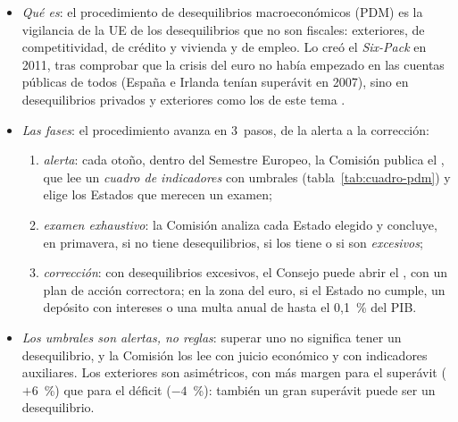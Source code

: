 \documentclass[11pt]{article}
\begin{document}
\begin{itemize}
\item \emph{Qué es}: el procedimiento de desequilibrios macroeconómicos (PDM) es la vigilancia de la UE de los desequilibrios que no son fiscales: exteriores, de competitividad, de crédito y vivienda y de empleo. Lo creó el \emph{Six-Pack} en 2011, tras comprobar que la crisis del euro no había empezado en las cuentas públicas de todos (España e Irlanda tenían superávit en 2007), sino en desequilibrios privados y exteriores como los de este tema\nocite{UE2011Reglamento1176,UE2011Reglamento1174} .
\item \emph{Las fases}: el procedimiento avanza en 3~pasos, de la alerta a la corrección:
  \begin{enumerate}
  \item \emph{alerta}: cada otoño, dentro del Semestre Europeo, la Comisión publica el , que lee un \emph{cuadro de indicadores} con umbrales (tabla~\ref{tab:cuadro-pdm}) y elige los Estados que merecen un examen;
  \item \emph{examen exhaustivo}: la Comisión analiza cada Estado elegido y concluye, en primavera, si no tiene desequilibrios, si los tiene o si son \emph{excesivos};
  \item \emph{corrección}: con desequilibrios excesivos, el Consejo puede abrir el , con un plan de acción correctora; en la zona del euro, si el Estado no cumple, un depósito con intereses o una multa anual de hasta el 0,1~\% del PIB.
  \end{enumerate}
\item \emph{Los umbrales son alertas, no reglas}: superar uno no significa tener un desequilibrio, y la Comisión los lee con juicio económico y con indicadores auxiliares. Los exteriores son asimétricos, con más margen para el superávit ($+6$~\%) que para el déficit ($-4$~\%): también un gran superávit puede ser un desequilibrio.
\end{itemize}
\end{document}
